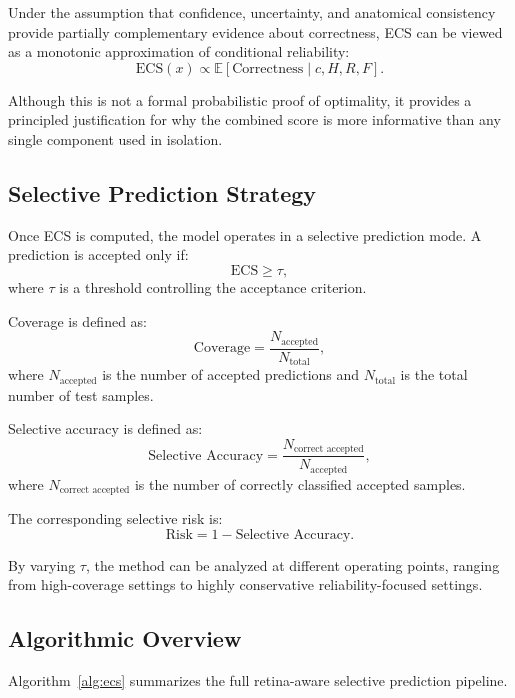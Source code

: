\documentclass[conference]{IEEEtran}
\begin{document}
Under the assumption that confidence, uncertainty, and anatomical consistency provide partially complementary evidence about correctness, ECS can be viewed as a monotonic approximation of conditional reliability:
\begin{equation}
\text{ECS}(x) \propto \mathbb{E}[\text{Correctness} \mid c, H, R, F].
\end{equation}

Although this is not a formal probabilistic proof of optimality, it provides a principled justification for why the combined score is more informative than any single component used in isolation.

\subsection{Selective Prediction Strategy}
Once ECS is computed, the model operates in a selective prediction mode. A prediction is accepted only if:
\begin{equation}
\text{ECS} \geq \tau,
\end{equation}
where $\tau$ is a threshold controlling the acceptance criterion.

Coverage is defined as:
\begin{equation}
\text{Coverage} = \frac{N_{\text{accepted}}}{N_{\text{total}}},
\end{equation}
where $N_{\text{accepted}}$ is the number of accepted predictions and $N_{\text{total}}$ is the total number of test samples.

Selective accuracy is defined as:
\begin{equation}
\text{Selective Accuracy} = \frac{N_{\text{correct accepted}}}{N_{\text{accepted}}},
\end{equation}
where $N_{\text{correct accepted}}$ is the number of correctly classified accepted samples.

The corresponding selective risk is:
\begin{equation}
\text{Risk} = 1 - \text{Selective Accuracy}.
\end{equation}

By varying $\tau$, the method can be analyzed at different operating points, ranging from high-coverage settings to highly conservative reliability-focused settings.

\subsection{Algorithmic Overview}
Algorithm~\ref{alg:ecs} summarizes the full retina-aware selective prediction pipeline.
\end{document}
